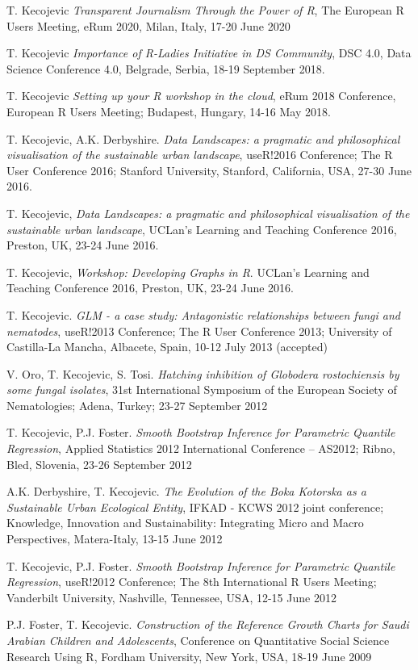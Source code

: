 \documentclass[
]{article}
\begin{document}
T. Kecojevic \emph{Transparent Journalism Through the Power of R}, The
European R Users Meeting, eRum 2020, Milan, Italy, 17-20 June 2020

T. Kecojevic \emph{Importance of R-Ladies Initiative in DS Community},
DSC 4.0, Data Science Conference 4.0, Belgrade, Serbia, 18-19 September
2018.

T. Kecojevic \emph{Setting up your R workshop in the cloud}, eRum 2018
Conference, European R Users Meeting; Budapest, Hungary, 14-16 May 2018.

T. Kecojevic, A.K. Derbyshire. \emph{Data Landscapes: a pragmatic and
philosophical visualisation of the sustainable urban landscape},
useR!2016 Conference; The R User Conference 2016; Stanford University,
Stanford, California, USA, 27-30 June 2016.

T. Kecojevic, \emph{Data Landscapes: a pragmatic and philosophical
visualisation of the sustainable urban landscape}, UCLan's Learning and
Teaching Conference 2016, Preston, UK, 23-24 June 2016.

T. Kecojevic, \emph{Workshop: Developing Graphs in R}. UCLan's Learning
and Teaching Conference 2016, Preston, UK, 23-24 June 2016.

T. Kecojevic. \emph{GLM - a case study: Antagonistic relationships
between fungi and nematodes}, useR!2013 Conference; The R User
Conference 2013; University of Castilla-La Mancha, Albacete, Spain,
10-12 July 2013 (accepted)

V. Oro, T. Kecojevic, S. Tosi. \emph{Hatching inhibition of Globodera
rostochiensis by some fungal isolates}, 31st International Symposium of
the European Society of Nematologies; Adena, Turkey; 23-27 September
2012

T. Kecojevic, P.J. Foster. \emph{Smooth Bootstrap Inference for
Parametric Quantile Regression}, Applied Statistics 2012 International
Conference -- AS2012; Ribno, Bled, Slovenia, 23-26 September 2012

A.K. Derbyshire, T. Kecojevic. \emph{The Evolution of the Boka Kotorska
as a Sustainable Urban Ecological Entity}, IFKAD - KCWS 2012 joint
conference; Knowledge, Innovation and Sustainability: Integrating Micro
and Macro Perspectives, Matera-Italy, 13-15 June 2012

T. Kecojevic, P.J. Foster. \emph{Smooth Bootstrap Inference for
Parametric Quantile Regression}, useR!2012 Conference; The 8th
International R Users Meeting; Vanderbilt University, Nashville,
Tennessee, USA, 12-15 June 2012

P.J. Foster, T. Kecojevic. \emph{Construction of the Reference Growth
Charts for Saudi Arabian Children and Adolescents}, Conference on
Quantitative Social Science Research Using R, Fordham University, New
York, USA, 18-19 June 2009
\end{document}
